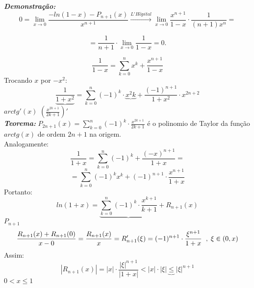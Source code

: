 \documentclass[12pt]{article}
\begin{document}
\textbf{\textit{Demonstração:}}
\[0 = \displaystyle\lim_{x\to 0}\frac{-ln(1-x)-P_{n+1}(x)}{x^{n+1}}\xrightarrow[]{L'H\hat{o}pital}\displaystyle\lim_{x\to 0}\frac{x^{n+1}}{1-x}\cdot\frac{1}{(n+1)x^n}=\]

\[=\frac{1}{n+1}\cdot\displaystyle\lim_{x\to 0}\frac{1}{1-x}=0.\]

\[\frac{1}{1-x}=\sum_{k=0}^{n}x^k+\frac{x^{n+1}}{1-x}\]
Trocando \(x\) por \(-x^2\):
\[\underbrace{\frac{1}{1+x^2}}=\sum_{k=0}^{n}(-1)^k\cdot\underbrace{x^2k}+\frac{(-1)^{n+1}}{1+x^2}\cdot x^{2n+2}\]
\hspace{2.7cm} \large{\(arctg'(x)\)} \hspace{1.1cm} \Large{\(\left(\frac{x^{2k+1}}{2k+1}\right)'\)}
\vspace{1cm}\\
\normalsize{\textbf{\textit{Teorema:}}} \(P_{2n+1}(x)=\sum_{k=0}^{n}(-1)^k\cdot\frac{x^{2k+1}}{2k+1}\) é o polinomio de Taylor da função \(arctg(x)\) de ordem \(2n+1\) na origem.\\

Analogamente:
\[\frac{1}{1+x}=\sum_{k=0}^{n}(-1)^k+\frac{(-x)^{n+1}}{1+x}=\]
\[=\sum_{k=0}^{n}(-1)^k x^k+(-1)^{n+1}\cdot\frac{x^{n+1}}{1+x}\]
Portanto:
\[ln(1+x)=\underbrace{\sum_{k=0}^{n}(-1)^k\cdot\frac{x^{k+1}}{k+1}}+R_{n+1}(x)\]
\hspace{6.5cm} \(P_{n+1}\)\\
\[\frac{R_{n+1}(x)+R_{n+1}(0)}{x-0}=\frac{R_{n+1}(x)}{x}=R'_{n+1}(\xi)=(-1)^{n+1}\cdot\frac{\xi^{n+1}}{1+x}\hspace{0.2cm},\hspace{0.1cm}\xi\in(0,x)\]
Assim:
\[\left|R_{n+1}(x)\right|=\left|x\right|\cdot\frac{\left|\xi\right|^{n+1}}{\left|1+x\right|}<\left|x\right|\cdot\left|\xi\right|\underbrace{\leqslant}\left|\xi\right|^{n+1}\]
\hspace{8.4cm} \(0<x\leq 1\)\\
\end{document}

